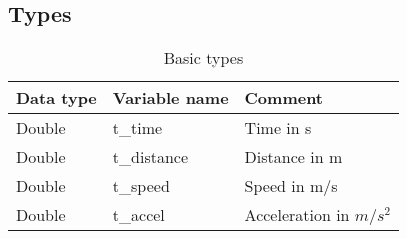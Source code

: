 \documentclass{template/openetcs_article}
\begin{document}
\subsection{Types}
\begin{longtable}{|l|l|l|}
	\caption{Basic types}\\ 
	\hline
		\begin{minipage}[t]{0.20\linewidth} \textbf{Data type}	\end{minipage}
	&	\begin{minipage}[t]{0.20\linewidth} \textbf{Variable name}	\end{minipage} 
	&	\begin{minipage}[t]{0.65\linewidth} \textbf{Comment} \end{minipage} \\
	\hline
		\begin{minipage}[t]{0.20\linewidth} Double	\end{minipage} 
	&	\begin{minipage}[t]{0.20\linewidth} t\_time \end{minipage} 
	&	\begin{minipage}[t]{0.65\linewidth} Time in s 	\end{minipage} \\
	\hline
		\begin{minipage}[t]{0.20\linewidth} Double	\end{minipage} 
	&	\begin{minipage}[t]{0.20\linewidth} t\_distance	\end{minipage} 
	&	\begin{minipage}[t]{0.65\linewidth} Distance in m 	\end{minipage} \\
	\hline
		\begin{minipage}[t]{0.20\linewidth} Double	\end{minipage} 
	&	\begin{minipage}[t]{0.20\linewidth} t\_speed	\end{minipage} 
	&	\begin{minipage}[t]{0.65\linewidth} Speed in m/s 	\end{minipage} \\
	\hline
		\begin{minipage}[t]{0.20\linewidth} Double	\end{minipage} 
	&	\begin{minipage}[t]{0.20\linewidth} t\_accel	\end{minipage} 
	&	\begin{minipage}[t]{0.65\linewidth} Acceleration in $m/s^{2}$ 	\end{minipage} \\
	\hline
\end{longtable}	
\end{document}
